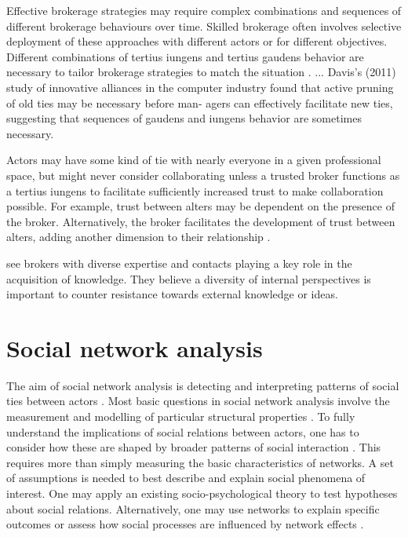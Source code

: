 Effective brokerage strategies may require complex combinations and sequences of different brokerage behaviours over time. Skilled brokerage often involves selective deployment of these approaches with different actors or for different objectives. Different combinations of tertius iungens and tertius gaudens behavior are necessary to tailor brokerage strategies to match the situation \citep{obstfeld2014brokerage}. ... Davis’s (2011) study of innovative alliances in the computer industry found that active pruning of old ties may be necessary before man- agers can effectively facilitate new ties, suggesting that sequences of gaudens and iungens behavior are sometimes necessary.

Actors may have some kind of tie with nearly everyone in a given professional space, but might never consider collaborating unless a trusted broker functions as a tertius iungens to facilitate sufficiently increased trust to make collaboration possible. For example, trust between alters may be dependent on the presence of the broker. Alternatively, the broker facilitates the development of trust between alters, adding another dimension to their relationship \citep{obstfeld2014brokerage}.

\citet{cohen1990absorptive} see brokers with diverse expertise and contacts playing a key role in the acquisition of knowledge. They believe a diversity of internal perspectives is important to counter resistance towards external knowledge or ideas.  

\section{Social network analysis}

The aim of social network analysis is detecting and interpreting patterns of social ties between actors \citep{de2011exploratory}. Most basic questions in social network analysis involve the measurement and modelling of particular structural properties \citep{butts2008social}. To fully understand the implications of social relations between actors, one has to consider how these are shaped by broader patterns of social interaction \citep{scott2011sage}. This requires more than simply measuring the basic characteristics of networks. A set of assumptions is needed to best describe and explain social phenomena of interest. One may apply an existing socio-psychological theory to test hypotheses about social relations. Alternatively, one may use networks to explain specific outcomes or assess how social processes are influenced by network effects \citep{scott2011sage,borgatti2013analyzing}. \medskip\medskip



